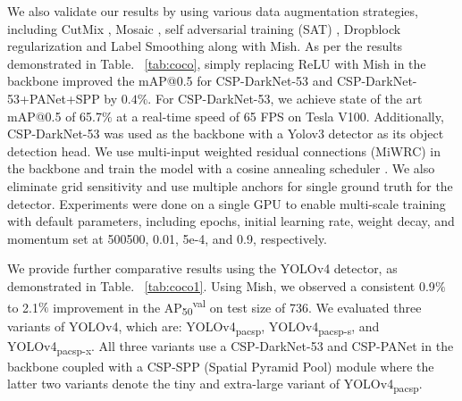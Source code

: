 \documentclass{bmvc2k}
\begin{document}
We also validate our results by using various data augmentation strategies, including CutMix \cite{yun2019cutmix} , Mosaic \cite{bochkovskiy2020yolov4}, self adversarial training (SAT) \cite{bochkovskiy2020yolov4}, Dropblock regularization \cite{ghiasi2018dropblock} and Label Smoothing \cite{muller2019does} along with Mish. As per the results demonstrated in Table. ~\ref{tab:coco}, simply replacing ReLU with Mish in the backbone improved the mAP@0.5 for CSP-DarkNet-53 and CSP-DarkNet-53+PANet+SPP by $0.4\%$. For CSP-DarkNet-53, we achieve state of the art mAP@0.5 of 65.7$\%$ at a real-time speed of 65 FPS on Tesla V100. Additionally, CSP-DarkNet-53 was used as the backbone with a Yolov3 detector \cite{redmon2018yolov3} as its object detection head. We use multi-input weighted residual connections (MiWRC) \cite{tan2019efficientdet} in the backbone and train the model with a cosine annealing scheduler \cite{loshchilov2016sgdr}. We also eliminate grid sensitivity and use multiple anchors for single ground truth for the detector. Experiments were done on a single GPU to enable multi-scale training with default parameters, including epochs, initial learning rate, weight decay, and momentum set at 500500, 0.01, 5e-4, and 0.9, respectively. 

\begin{table}[h]
	\begin{center}
	\end{center}
	\caption{Comparison between ReLU and Mish activation functions on object detection on MS-COCO dataset.}
	\label{tab:coco}
\end{table}

We provide further comparative results using the YOLOv4 \cite{bochkovskiy2020yolov4} detector, as demonstrated in Table. ~\ref{tab:coco1}. Using Mish, we observed a consistent 0.9$\%$ to 2.1$\%$ improvement in the AP\textsubscript{50}\textsuperscript{val} on test size of 736. We evaluated three variants of YOLOv4, which are: YOLOv4\textsubscript{pacsp}, YOLOv4\textsubscript{pacsp-s}, and YOLOv4\textsubscript{pacsp-x}. All three variants use a CSP-DarkNet-53 \cite{wang2019cspnet} and CSP-PANet in the backbone coupled with a CSP-SPP \cite{he2015spatial} (Spatial Pyramid Pool) module where the latter two variants denote the tiny and extra-large variant of YOLOv4\textsubscript{pacsp}.
\end{document}
